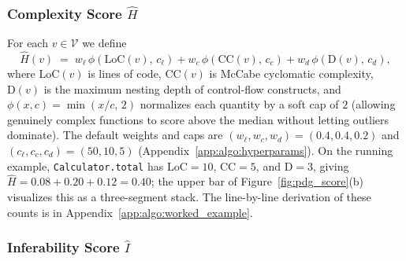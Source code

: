\subsubsection{Complexity Score $\hat{H}$}
\label{sec:method:complexity}

For each $v \in \mathcal{V}$ we define
%
\begin{equation}
  \hat{H}(v) \;=\; w_{\ell}\,\phi\!\left(\mathrm{LoC}(v),\,c_{\ell}\right)
            + w_{c}\,\phi\!\left(\mathrm{CC}(v),\,c_{c}\right)
            + w_{d}\,\phi\!\left(\mathrm{D}(v),\,c_{d}\right),
  \label{eq:complexity}
\end{equation}
%
where $\mathrm{LoC}(v)$ is lines of code, $\mathrm{CC}(v)$ is McCabe
cyclomatic complexity, $\mathrm{D}(v)$ is the maximum nesting depth of
control-flow constructs, and $\phi(x, c) = \min(x / c,\, 2)$ normalizes
each quantity by a soft cap of $2$ (allowing genuinely complex functions
to score above the median without letting outliers dominate). The
default weights and caps are
$(w_{\ell},w_{c},w_{d})\!=\!(0.4,0.4,0.2)$ and
$(c_{\ell},c_{c},c_{d})\!=\!(50,10,5)$
(Appendix~\ref{app:algo:hyperparams}). On the running example,
\texttt{Calculator.total} has $\mathrm{LoC}\!=\!10$,
$\mathrm{CC}\!=\!5$, and $\mathrm{D}\!=\!3$, giving
$\hat{H}\!=\!0.08\!+\!0.20\!+\!0.12\!=\!0.40$;
the upper bar of Figure~\ref{fig:pdg_score}(b) visualizes this as a
three-segment stack. The line-by-line derivation of these counts is in
Appendix~\ref{app:algo:worked_example}.

\subsubsection{Inferability Score $\hat{I}$}
\label{sec:method:inferability}

